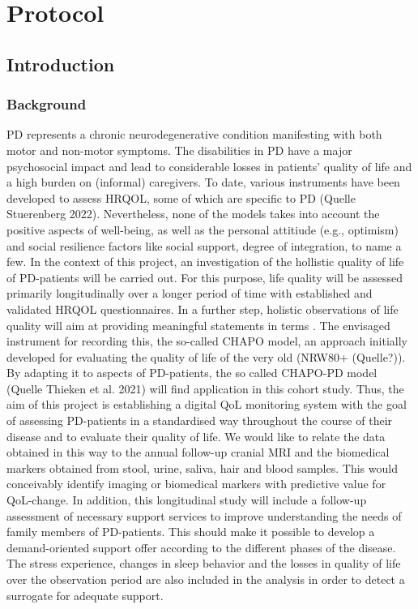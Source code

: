 \chapter{Protocol}
\section{Introduction}
\subsection{Background}
\ac{PD} represents a chronic neurodegenerative condition manifesting with both motor and non-motor symptoms. The disabilities in \ac{PD} have a major psychosocial impact and lead to considerable losses in patients' quality of life and a high burden on (informal) caregivers. To date, various instruments have been developed to assess \ac{HRQOL}, some of which are specific to \ac{PD} (Quelle Stuerenberg 2022). Nevertheless, none of the models takes into account the positive aspects of well-being, as well as the personal attitiude (e.g., optimism) and social resilience factors like social support, degree of integration, to name a few. In the context of this project, an investigation of the hollistic quality of life of \ac{PD}-patients will be carried out. For this purpose, life quality will be assessed primarily longitudinally over a longer period of time with established and validated \ac{HRQOL} questionnaires. In a further step, holistic observations of life quality will aim at providing meaningful statements in terms . The envisaged instrument for recording this, the so-called \ac{CHAPO} model, an approach initially developed for evaluating the quality of life of the very old (NRW80+ (Quelle?)). By adapting it to aspects of \ac{PD}-patients, the so called \acs{CHAPO-PD} model (Quelle Thieken et al. 2021) will find application in this cohort study. Thus, the aim of this project is establishing a digital \ac{QoL} monitoring system with the goal of assessing \ac{PD}-patients in a standardised way throughout the course of their disease and to evaluate their quality of life. We would like to relate the data obtained in this way to the annual follow-up cranial \ac{MRI} and the biomedical markers obtained from stool, urine, saliva, hair and blood samples. This would conceivably identify imaging or biomedical markers with predictive value for \ac{QoL}-change. In addition, this longitudinal study will include a follow-up assessment of necessary support services to improve understanding the needs of family members of \ac{PD}-patients. This should make it possible to develop a demand-oriented support offer according to the different phases of the disease. The stress experience, changes in sleep behavior and the losses in quality of life over the observation period are also included in the analysis in order to detect a surrogate for adequate support.

